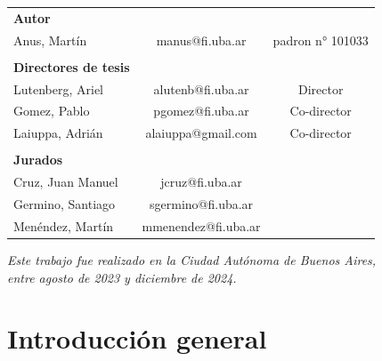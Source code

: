 \documentclass[11pt,a4paper]{article}
\begin{document}
\begin{titlepage}
\begin{table}[htb]
    \begin{tabular}{lcc} 
        \textbf{Autor}              &     &     \\
        Anus, Martín     &    manus@fi.uba.ar & padron n° 101033   \\
        & & \\
         \textbf{Directores de tesis} &         &   \\
         Lutenberg, Ariel       & alutenb@fi.uba.ar & Director  \\
         Gomez, Pablo       & pgomez@fi.uba.ar   & Co-director \\
        Laiuppa, Adrián      & alaiuppa@gmail.com & Co-director     \\
        & &  \\
         \textbf{Jurados}        & \\
         Cruz, Juan Manuel       & jcruz@fi.uba.ar   & \\
         Germino, Santiago        & sgermino@fi.uba.ar   & \\
         Menéndez, Martín        & mmenendez@fi.uba.ar   & 
        \end{tabular}
     \end{table}



\vspace*{1cm}
	

\textit{\large{Este trabajo fue realizado en la Ciudad Autónoma de Buenos Aires,}} \\
\textit{\large{entre agosto de 2023 y diciembre de 2024.}}

\end{titlepage}

\newpage

\newpage


\newpage
\tableofcontents

\newpage
\listoffigures

\newpage
\listoftables

\newpage
\setcounter{page}{1}



\section{Introducción general}



\end{document}
